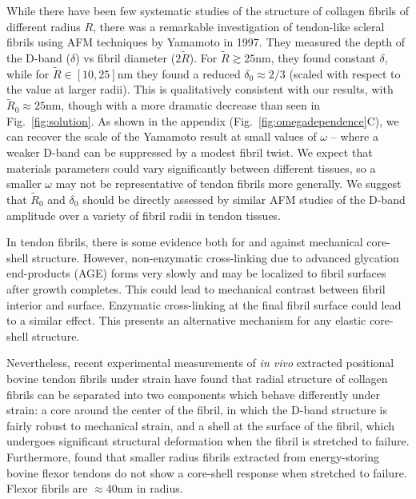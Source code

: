 \documentclass[twoside,twocolumn,9pt]{article}
\begin{document}
While there have been few systematic studies of the structure of collagen fibrils of different radius $R$, there was a remarkable investigation of tendon-like scleral fibrils using AFM techniques by Yamamoto in 1997.\cite{Yamamoto:1997} They measured the depth of the D-band ($\delta$) vs fibril diameter ($2 \tilde{R}$). For $\tilde{R} \gtrsim 25$nm, they found constant $\delta$, while for $\tilde{R} \in [10,25]$nm they found a reduced $\delta_0 \approx 2/3$ (scaled with respect to the value at larger radii). This is  qualitatively consistent with our results, with $\tilde{R}_0 \approx 25$nm, though with a more dramatic decrease than seen in Fig.~\ref{fig:solution}. As shown in the appendix (Fig.~\ref{fig:omegadependence}C), we can recover the scale of the Yamamoto result at small values of $\omega$ -- where a weaker D-band can be suppressed by a modest fibril twist. We expect that materials parameters could vary significantly between different tissues, so a smaller $\omega$ may not be representative of tendon fibrils more generally. We suggest that $\tilde{R}_0$ and $\delta_0$ should be directly assessed by similar AFM studies of the D-band amplitude over a variety of fibril radii in tendon tissues.\cite{Kalson:2015, Goh:2012, PattersonKane:1997, Parry:1978}

In tendon fibrils, there is some evidence both for \cite{Gutsmann:2003} and against \cite{Wenger:2008, Strasser:2007} mechanical core-shell structure. However, non-enzymatic cross-linking due to advanced glycation end-products (AGE) forms very slowly and may be localized to fibril surfaces after growth completes.\cite{Slatter:2008} This could lead to mechanical contrast between fibril interior and surface. Enzymatic cross-linking at the final fibril surface could lead to a similar effect. This presents an alternative mechanism for any elastic core-shell structure.

Nevertheless, recent experimental measurements of \textit{in vivo} extracted positional bovine tendon fibrils under strain have found that radial structure of collagen fibrils can be separated into two components which behave differently under strain: a core around the center of the fibril, in which the D-band structure is fairly robust to mechanical strain, and a shell at the surface of the fibril, which undergoes significant structural deformation when the fibril is stretched to failure.\cite{Quigley:2018} Furthermore, \citet{Quigley:2018} found that smaller radius fibrils extracted from  energy-storing bovine flexor tendons do not show a core-shell response when stretched to failure. Flexor fibrils are $\approx 40\text{nm}$ in radius.\cite{Herod:2016} 
\end{document}
